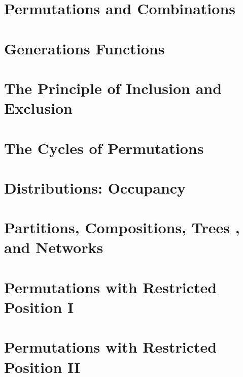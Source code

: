 \documentclass[10pt,a4paper]{book}
\begin{document}
\newenvironment{enunciation}{}{}

\chapter{Permutations and Combinations}
%
%
%



%

\chapter{Generations Functions}

\chapter{The Principle of Inclusion and Exclusion}

\chapter{The Cycles of Permutations}

\chapter{Distributions: Occupancy}

\chapter{Partitions, Compositions, Trees , and Networks}

\chapter{Permutations with Restricted Position I}

\chapter{Permutations with Restricted Position II}
\end{document}
